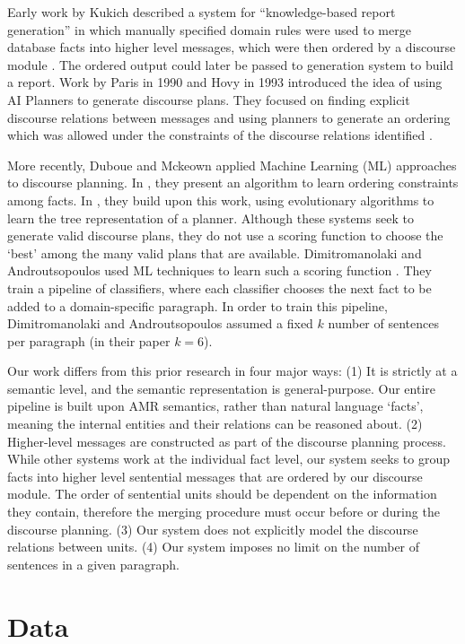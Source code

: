 \documentclass[12pt]{article}
\begin{document}
Early work by Kukich described a system for ``knowledge-based report generation'' in which manually specified domain rules were used to merge database facts into higher level messages, which were then ordered by a discourse module \cite{kukich1983knowledge}. The ordered output could later be passed to generation system to build a report. Work by Paris in 1990 and Hovy in 1993 introduced the idea of using AI Planners to generate discourse plans. They focused on finding explicit discourse relations between messages and using planners to generate an ordering which was allowed under the constraints of the discourse relations identified \cite{paris1990natural}\cite{hovy1993automated}. 

More recently, Duboue and Mckeown applied Machine Learning (ML) approaches to discourse planning. In \cite{duboue2001empirically}, they present an algorithm to learn ordering constraints among facts. In \cite{duboue2002content}, they build upon this work, using evolutionary algorithms to learn the tree representation of a planner. Although these systems seek to generate valid discourse plans, they do not use a scoring function to choose the `best' among the many valid plans that are available. Dimitromanolaki and Androutsopoulos used ML techniques to learn such a scoring function \cite{learning_to_order_facts}. They train a pipeline of classifiers, where each classifier chooses the next fact to be added to a domain-specific paragraph. In order to train this pipeline, Dimitromanolaki and Androutsopoulos assumed a fixed $k$ number of sentences per paragraph (in their paper $k=6$).

Our work differs from this prior research in four major ways: (1) It is strictly at a semantic level, and the semantic representation is general-purpose. Our entire pipeline is built upon AMR semantics, rather than natural language `facts', meaning the internal entities and their relations can be reasoned about. (2) Higher-level messages are constructed as part of the discourse planning process. While other systems work at the individual fact level, our system seeks to group facts into higher level sentential messages that are ordered by our discourse module. The order of sentential units should be dependent on the information they contain, therefore the merging procedure must occur before or during the discourse planning. (3) Our system does not explicitly model the discourse relations between units. (4) Our system imposes no limit on the number of sentences in a given paragraph.

\section{Data}
\label{sec:data}
\end{document}
